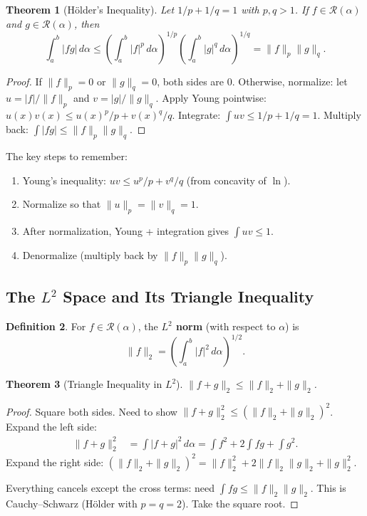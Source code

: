 \documentclass[11pt]{article}
\theoremstyle{myplain}
\newtheorem{theorem}{Theorem}[section]
\theoremstyle{definition}
\newtheorem{definition}[theorem]{Definition}
\theoremstyle{remark}
\begin{document}
\begin{theorem}[H\"{o}lder's Inequality]
Let $1/p + 1/q = 1$ with $p, q > 1$. If $f \in \mathscr{R}(\alpha)$ and $g \in \mathscr{R}(\alpha)$, then
$$\int_a^b |fg|\,d\alpha \leq \left(\int_a^b |f|^p\,d\alpha\right)^{1/p} \left(\int_a^b |g|^q\,d\alpha\right)^{1/q} = \|f\|_p \|g\|_q.$$
\end{theorem}

\begin{proof}
If $\|f\|_p = 0$ or $\|g\|_q = 0$, both sides are 0. Otherwise, normalize: let $u = |f|/\|f\|_p$ and $v = |g|/\|g\|_q$. Apply Young pointwise: $u(x)v(x) \leq u(x)^p/p + v(x)^q/q$. Integrate: $\int uv \leq 1/p + 1/q = 1$. Multiply back: $\int|fg| \leq \|f\|_p\|g\|_q$.
\end{proof}

\begin{insight}
The key steps to remember:
\begin{enumerate}
  \item Young's inequality: $uv \leq u^p/p + v^q/q$ (from concavity of $\ln$).
  \item Normalize so that $\|u\|_p = \|v\|_q = 1$.
  \item After normalization, Young + integration gives $\int uv \leq 1$.
  \item Denormalize (multiply back by $\|f\|_p\|g\|_q$).
\end{enumerate}
\end{insight}

\subsection{The $L^2$ Space and Its Triangle Inequality}

\begin{definition}
For $f \in \mathscr{R}(\alpha)$, the \textbf{$L^2$ norm} (with respect to $\alpha$) is
$$\|f\|_2 = \left(\int_a^b |f|^2\,d\alpha\right)^{1/2}.$$
\end{definition}

\begin{theorem}[Triangle Inequality in $L^2$]
$\|f + g\|_2 \leq \|f\|_2 + \|g\|_2$.
\end{theorem}

\begin{proof}
Square both sides. Need to show $\|f+g\|_2^2 \leq (\|f\|_2 + \|g\|_2)^2$. Expand the left side:
\begin{align*}
\|f+g\|_2^2 &= \int |f+g|^2\,d\alpha = \int f^2 + 2\int fg + \int g^2.
\end{align*}
Expand the right side: $(\|f\|_2 + \|g\|_2)^2 = \|f\|_2^2 + 2\|f\|_2\|g\|_2 + \|g\|_2^2$.

Everything cancels except the cross terms: need $\int fg \leq \|f\|_2\|g\|_2$. This is Cauchy--Schwarz (Hölder with $p=q=2$). Take the square root.
\end{proof}
\end{document}

